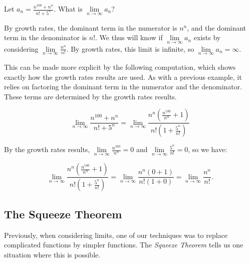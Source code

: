 \documentclass{ximera}
\begin{document}
\begin{example}
  Let $a_n  = \frac{n^{100} + n^n}{n!+5^n}$.  What is $\lim\limits_{n \to \infty} a_n$?
  
  \begin{explanation}
  By growth rates, the dominant term in the numerator is $n^n$, and the dominant term in the denominator is $n!$.  We thus will know if $\lim\limits_{n \to \infty} a_n$ exists by considering $\lim\limits_{n \to \infty} \frac{n^n}{n!}$.  By growth rates, this limit is infinite, so $\lim\limits_{n \to \infty} a_n = \infty$.
  
This can be made more explicit by the following computation, which shows exactly how the growth rates results are used.  As with a previous example, it relies on factoring the dominant term in the numerator and the denominator.  These terms are determined by the growth rates results.

\[
\lim\limits_{n \to \infty} \frac{n^{100} + n^n}{n!+5^n} = \lim\limits_{n \to \infty} \frac{n^n \left(\frac{n^{100}}{n^n} + 1\right)}{n!\left(1+\frac{5^n}{n!}\right)} 
\]

By the growth rates results, $\lim\limits_{n \to \infty} \frac{n^{100}}{n^n} =0$ and  $\lim\limits_{n \to \infty}\frac{5^n}{n!} =0$, so we have: 
  
 \[  \lim\limits_{n \to \infty} \frac{n^n \left(\frac{n^{100}}{n^n} + 1\right)}{n!\left(1+\frac{5^n}{n!}\right)} =   \lim\limits_{n \to \infty} \frac{n^n \left(0 + 1\right)}{n!\left(1+0\right)} = \lim\limits_{n \to \infty} \frac{n^n}{n!}.  \]
   
   
  \end{explanation}
\end{example}















\subsection{The Squeeze Theorem}

%

Previously, when considering limits, one of our techniques was to replace 
complicated functions by simpler functions. The \textit{Squeeze Theorem}
tells us one situation where this is possible.
\end{document}

